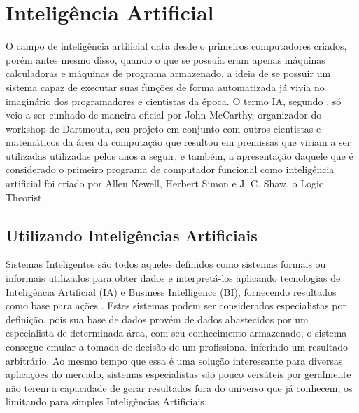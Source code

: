 \chapter{Intelig{\^e}ncia Artificial}

O campo de inteligência artificial data desde o primeiros computadores
criados, porém antes mesmo disso, quando o que se possuía eram apenas
máquinas calculadoras e máquinas de programa armazenado, a ideia de se
possuir um sistema capaz de executar suas funções de forma
automatizada já vivia no imaginário dos programadores e cientistas da
época. O termo IA, segundo , só veio a ser
cunhado de maneira oficial por John McCarthy, organizador do workshop
de Dartmouth, seu projeto em conjunto com outros cientistas e
matemáticos da área da computação que resultou em premissas que viriam
a ser utilizadas utilizadas pelos anos a seguir, e também, a
apresentação daquele que é considerado o primeiro programa de
computador funcional como inteligência artificial foi criado por Allen
Newell, Herbert Simon e J. C. Shaw, o Logic Theorist.

\section{Utilizando Intelig{\^e}ncias Artificiais}

Sistemas Inteligentes são todos aqueles definidos como sistemas
formais ou informais utilizados para obter dados e interpretá-los
aplicando tecnologias de Inteligência Artificial (IA) e Business
Intelligence (BI), fornecendo resultados como base para ações
\cite{sharda2017}. Estes sistemas podem ser considerados especialistas
por definição, pois sua base de dados provém de dados abastecidos por
um especialista de determinada área, com seu conhecimento armazenado,
o sistema consegue emular a tomada de decisão de um profissional
inferindo um resultado arbitrário. Ao mesmo tempo que essa é uma
solução interessante para diversas aplicações do mercado, sistemas
especialistas são pouco versáteis por geralmente não terem a
capacidade de gerar resultados fora do universo que já conhecem, os
limitando para simples Inteligências Artificiais.

